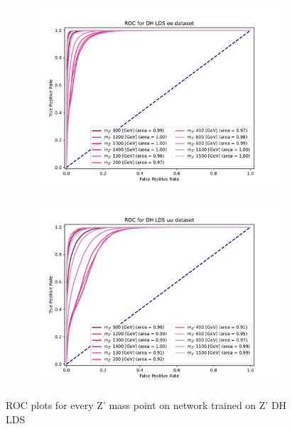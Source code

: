 \documentclass[12pt, a4paper]{book}
\begin{document}
\begin{figure}[!ht]
	\centering
	\begin{subfigure}[b]{0.49\textwidth}
      \centering
      \includegraphics[width=1\textwidth]{XGBoost/DH_LDS/ROC_ee.pdf}
      \end{subfigure}
   \hfill
   \begin{subfigure}[b]{0.49\textwidth}
      \centering
      \includegraphics[width=1\textwidth]{XGBoost/DH_LDS/ROC_uu.pdf}
      \end{subfigure}
   \caption{ROC plots for every Z' mass point on network trained on Z' DH LDS}\label{fig:DH_LDS_ROCS}
\end{figure}
\end{document}
